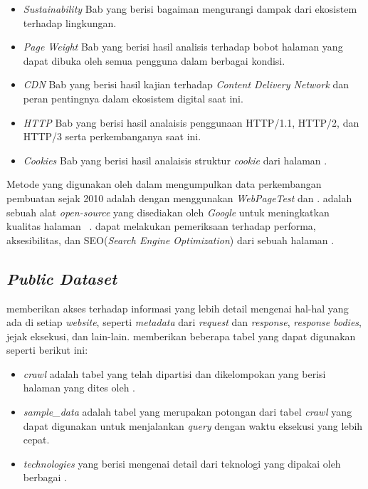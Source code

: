 \begin{itemize}
    \item \textit{Sustainability} Bab yang berisi bagaiman mengurangi dampak dari ekosistem \web terhadap lingkungan.
    \item \textit{Page Weight} Bab yang berisi hasil analisis terhadap bobot halaman yang dapat dibuka oleh semua pengguna dalam berbagai kondisi.
    \item \textit{CDN} Bab yang berisi hasil kajian terhadap \textit{Content Delivery Network} dan peran pentingnya dalam ekosistem digital saat ini.
    \item \textit{HTTP} Bab yang berisi hasil analaisis penggunaan HTTP/1.1, HTTP/2, dan HTTP/3 serta perkembanganya saat ini.
    \item \textit{Cookies} Bab yang berisi hasil analaisis struktur \textit{cookie} dari halaman \web.
\end{itemize}

Metode yang digunakan oleh \http dalam mengumpulkan data perkembangan pembuatan \web sejak 2010 adalah dengan menggunakan \textit{WebPageTest} dan \light. \light adalah sebuah alat \textit{open-source} yang disediakan oleh \textit{Google} untuk meningkatkan kualitas halaman \web~\cite{lighthouse}. \light dapat melakukan pemeriksaan terhadap performa, aksesibilitas, dan SEO(\textit{Search Engine Optimization}) dari sebuah halaman \web.

\subsection{\textit{Public Dataset}}
\label{subsec:pd}
\http memberikan akses terhadap informasi yang lebih detail mengenai hal-hal yang ada di setiap \textit{website}, seperti \textit{metadata} dari \textit{request} dan \textit{response}, \textit{response bodies}, jejak eksekusi, dan lain-lain. \http memberikan beberapa tabel yang dapat digunakan seperti berikut ini:

\begin{itemize}
    \item \textit{crawl} adalah tabel yang telah dipartisi dan dikelompokan yang berisi halaman yang dites oleh \http.
    \item \textit{sample\_data} adalah tabel yang merupakan potongan dari tabel \textit{crawl} yang dapat digunakan untuk menjalankan \textit{query} dengan waktu eksekusi yang lebih cepat.
    \item \textit{technologies} yang berisi mengenai detail dari teknologi yang dipakai oleh berbagai \web.
\end{itemize}


